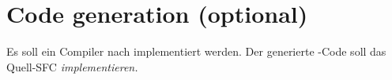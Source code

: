 \section{Code generation (optional)}
\label{sec:codegeneration}

Es soll ein Compiler nach \Java{} implementiert werden.  Der generierte
\Java-Code soll das Quell-SFC \emph{implementieren.}


